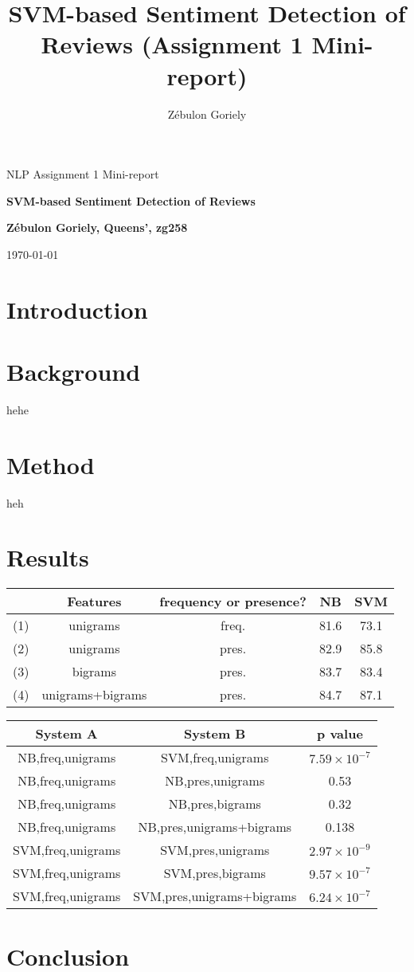 \documentclass[12pt]{article}
\title{\bf{SVM-based Sentiment Detection of Reviews (Assignment 1 Mini-report)}}
\author{\Large{Z\'ebulon Goriely}}
\begin{document}
\centerline{\large NLP Assignment 1 Mini-report}
\vspace{0.2in}
\centerline{\Large\bf SVM-based Sentiment Detection of Reviews}
\vspace{0.2in}
\centerline{\large {\bf{Z\'ebulon Goriely, Queens', zg258}}}
\vspace{0.2in}
\centerline{\large {\today}}

\begin{multicols}{2}

\section*{Introduction}
\lipsum[1-2]
\section*{Background}
hehe
\section*{Method}
heh
\section*{Results}

\begin{table*}[t]
\centering
 \begin{tabular}{| c | c | c ||c|c|} 
 \hline
   & Features & frequency or presence? & NB & SVM\\ [0.5ex] 
 \hline\hline
 (1) & unigrams & freq. & 81.6 & 73.1\\ 
 \hline
 (2) & unigrams & pres. & 82.9 & 85.8\\
 \hline
 (3) & bigrams & pres. & 83.7 & 83.4 \\
 \hline
 (4) & unigrams+bigrams & pres. & 84.7 & 87.1 \\
 \hline
\end{tabular}
\end{table*}

\begin{table*}[t]
\centering
 \begin{tabular}{|c|c||c|} 
 \hline
  System A & System B & p value\\ [0.5ex] 
 \hline\hline
NB,freq,unigrams & SVM,freq,unigrams & $7.59\times 10^{-7}$\\
 \hline
NB,freq,unigrams & NB,pres,unigrams & 0.53\\
 \hline
NB,freq,unigrams & NB,pres,bigrams & 0.32\\
 \hline
NB,freq,unigrams & NB,pres,unigrams+bigrams & 0.138 \\
 \hline
SVM,freq,unigrams & SVM,pres,unigrams & $2.97\times 10^{-9}$ \\
 \hline
SVM,freq,unigrams & SVM,pres,bigrams & $9.57\times 10^{-7}$ \\
 \hline
 SVM,freq,unigrams & SVM,pres,unigrams+bigrams & $6.24\times 10^{-7}$ \\
 \hline
\end{tabular}
\end{table*}

\section*{Conclusion}
\lipsum[3-6]

\end{multicols}
\end{document}
